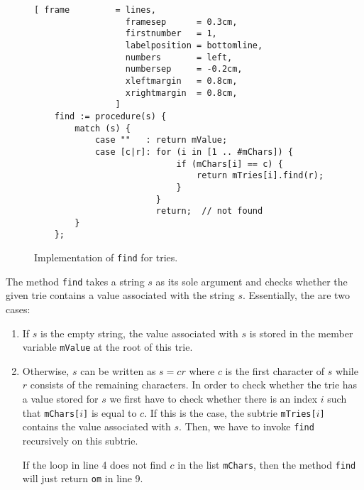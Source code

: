 \begin{figure}[!ht]
\centering
\begin{Verbatim}[ frame         = lines, 
                  framesep      = 0.3cm, 
                  firstnumber   = 1,
                  labelposition = bottomline,
                  numbers       = left,
                  numbersep     = -0.2cm,
                  xleftmargin   = 0.8cm,
                  xrightmargin  = 0.8cm,
                ]
    find := procedure(s) {
        match (s) {
            case ""   : return mValue;
            case [c|r]: for (i in [1 .. #mChars]) {
                            if (mChars[i] == c) {
                                return mTries[i].find(r);
                            }
                        }
                        return;  // not found
        }
    };
\end{Verbatim}
\vspace*{-0.3cm}
\caption{Implementation of \texttt{find} for tries.}
\label{fig:trie.stlx-find}
\end{figure}

The method \texttt{find} takes a string $s$ as its sole argument and checks whether the given trie
contains a value associated with the string $s$.  Essentially, the are two cases:
\begin{enumerate}
\item If $s$ is the empty string, the value associated with $s$ is stored in the member variable
      \texttt{mValue} at the root of this trie.
\item Otherwise, $s$ can be written as $s = cr$ where $c$ is the first character of $s$ while $r$
      consists of the remaining characters.  In order to check whether the trie has a value stored
      for $s$ we first have to check whether there is an index $i$ such that \texttt{mChars[$i$]} is
      equal to $c$.  If this is the case, the subtrie \texttt{mTries[$i$]} contains the value
      associated with $s$.  Then, we have to invoke \texttt{find} recursively on this subtrie.

      If the loop in line 4 does not find $c$ in the list \texttt{mChars}, then the method
      \texttt{find} will just return \texttt{om} in line 9.
\end{enumerate}


